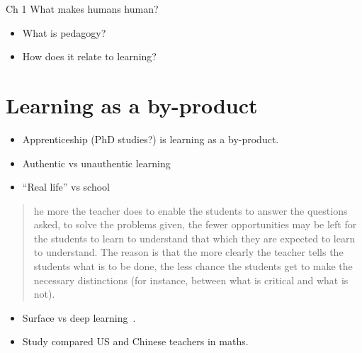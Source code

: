 \begin{frame}
  \begin{block}{Ch 1 What makes humans human?}
    \begin{itemize}
      \item What is pedagogy?
      \item How does it relate to learning?
    \end{itemize}
  \end{block}
\end{frame}

\section{Learning as a by-product}

\begin{frame}
  \begin{example}
    \begin{itemize}
      \item Apprenticeship (PhD studies?) is learning as a by-product.
    \end{itemize}
  \end{example}

  \pause

  \begin{example}
    \begin{itemize}
      \item Authentic vs unauthentic learning
      \item \enquote{Real life} vs school
    \end{itemize}
  \end{example}
\end{frame}

\begin{frame}
  \begin{example}
    \blockcquote[p.~13]{NecessaryConditionsOfLearning}{%
      he more the teacher does to enable the students to answer the 
      questions asked, to solve the problems given, the fewer opportunities may 
      be left for the students to learn to understand that which they are 
      expected to learn to understand. The reason is that the more clearly the 
      teacher tells the students what is to be done, the less chance the 
      students get to make the necessary distinctions (for instance, between 
      what is critical and what is not).%
    }
  \end{example}

  \pause

  \begin{remark}
    \begin{itemize}
      \item Surface vs deep learning~\cite{DeepSurfaceLearning}.
      \item Study compared US and Chinese teachers in maths.
    \end{itemize}
  \end{remark}
\end{frame}


